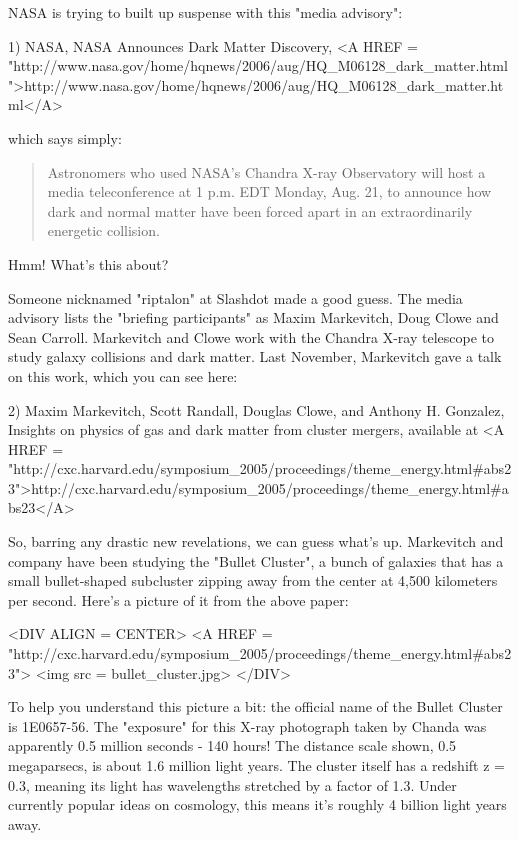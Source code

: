 



NASA is trying to built up suspense with this "media advisory":

1) NASA, NASA Announces Dark Matter Discovery, 
<A HREF = "http://www.nasa.gov/home/hqnews/2006/aug/HQ_M06128_dark_matter.html">http://www.nasa.gov/home/hqnews/2006/aug/HQ_M06128_dark_matter.html</A>

which says simply:

\begin{quote}
 Astronomers who used NASA's Chandra X-ray Observatory will host 
 a media teleconference at 1 p.m. EDT Monday, Aug. 21, to announce 
 how dark and normal matter have been forced apart in an extraordinarily 
 energetic collision.
\end{quote}
Hmm!  What's this about?

Someone nicknamed "riptalon" at Slashdot made a good guess.
The media advisory 
lists the "briefing participants" as Maxim Markevitch, Doug
Clowe and Sean Carroll.   Markevitch and Clowe work with the Chandra
X-ray telescope to study galaxy collisions and dark matter.  Last 
November, Markevitch gave a talk on this work, which you can see here:

2) Maxim Markevitch, Scott Randall, Douglas Clowe, and Anthony H. Gonzalez,
Insights on physics of gas and dark matter from cluster mergers, available at 
<A HREF = "http://cxc.harvard.edu/symposium_2005/proceedings/theme_energy.html#abs23">http://cxc.harvard.edu/symposium_2005/proceedings/theme_energy.html#abs23</A>

So, barring any drastic new revelations, we can guess what's up.
Markevitch and company have been studying the "Bullet Cluster", a 
bunch of galaxies that has a small bullet-shaped subcluster zipping 
away from the center at 4,500 kilometers per second.  Here's a picture
of it from the above paper:

<DIV ALIGN = CENTER>
<A HREF = "http://cxc.harvard.edu/symposium_2005/proceedings/theme_energy.html#abs23">
<img src = bullet_cluster.jpg>
</DIV>


To help you understand this picture a bit: the official
name of the Bullet Cluster is 1E0657-56.  The "exposure"
for this X-ray photograph taken by Chanda
was apparently 0.5 million seconds - 140 hours!
The distance scale shown, 0.5 megaparsecs, is about 1.6 million light years.
The cluster itself has a redshift z = 0.3, meaning its light
has wavelengths stretched by a factor of 1.3.  Under currently 
popular ideas on cosmology, this means it's
roughly 4 billion light years away.

